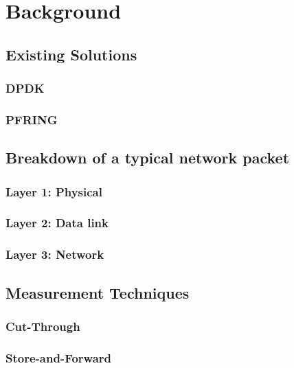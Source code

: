 \chapter{Background}\label{C:back}

\section{Existing Solutions}

\subsection{DPDK}

\subsection{PF\textunderscore RING}

\section{Breakdown of a typical network packet}

\subsection{Layer 1: Physical}

\subsection{Layer 2: Data link}

\subsection{Layer 3: Network}

\section{Measurement Techniques}

\subsection{Cut-Through}

\subsection{Store-and-Forward}

